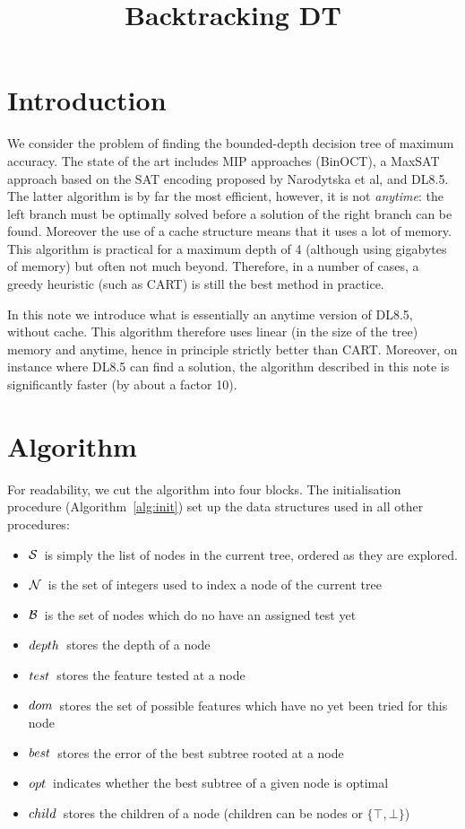 \documentclass{article}
\title{Backtracking DT}
\newcommand{\nodes}[0]{\ensuremath{{\cal N}}}
\newcommand{\blossom}[0]{\ensuremath{{\cal B}}}
\newcommand{\sequence}[0]{\ensuremath{{\cal S}}}
\newcommand{\depth}[1][]{\ensuremath{\ifthenelse{\equal{#1}{}}{depth}{depth({#1})}}}
\newcommand{\test}[1][]{\ensuremath{\ifthenelse{\equal{#1}{}}{test}{test({#1})}}}
\newcommand{\dom}[1][]{\ensuremath{\ifthenelse{\equal{#1}{}}{dom}{dom({#1})}}}
\newcommand{\best}[1][]{\ensuremath{\ifthenelse{\equal{#1}{}}{{best}}{{best({#1})}}}}
\newcommand{\opt}[1][]{\ensuremath{\ifthenelse{\equal{#1}{}}{opt}{opt({#1})}}}
\newcommand{\child}[1][]{\ensuremath{\ifthenelse{\equal{#1}{}}{{child}}{{child({{#1}})}}}}
\begin{document}

\maketitle

\section*{Introduction}

We consider the problem of finding the bounded-depth decision tree of maximum accuracy.
The state of the art includes MIP approaches (BinOCT), a MaxSAT approach based on the SAT encoding proposed by Narodytska et al, and DL8.5.
The latter algorithm is by far the most efficient, however, it is not \emph{anytime}: the left branch must be optimally solved before a solution of the right branch can be found. Moreover the use of a cache structure means that it uses a lot of memory. This algorithm is practical for a maximum depth of 4 (although using gigabytes of memory) but often not much beyond. Therefore, in a number of cases, a greedy heuristic (such as CART) is still the best method in practice.

\medskip

In this note we introduce what is essentially an anytime version of DL8.5, without cache.
This algorithm therefore uses linear (in the size of the tree) memory and anytime, hence in principle strictly better than CART. Moreover, on instance where DL8.5 can find a solution, the algorithm described in this note is significantly faster (by about a factor 10).

\section*{Algorithm}

For readability, we cut the algorithm into four blocks. The initialisation procedure (Algorithm~\ref{alg:init}) set up the data structures used in all other procedures:
\begin{itemize}
	\item \sequence\ is simply the list of nodes in the current tree, ordered as they are explored.
	\item \nodes\ is the set of integers used to index a node of the current tree
	\item \blossom\ is the set of nodes which do no have an assigned test yet
	\item \depth\ stores the depth of a node
	\item \test\ stores the feature tested at a node
	\item \dom\ stores the set of possible features which have no yet been tried for this node 
	\item \best\ stores the error of the best subtree rooted at a node 
	\item \opt\ indicates whether the best subtree of a given node is optimal
	\item \child\ stores the children of a node (children can be nodes or $\{\top, \bot\}$)
\end{itemize}
\end{document}
